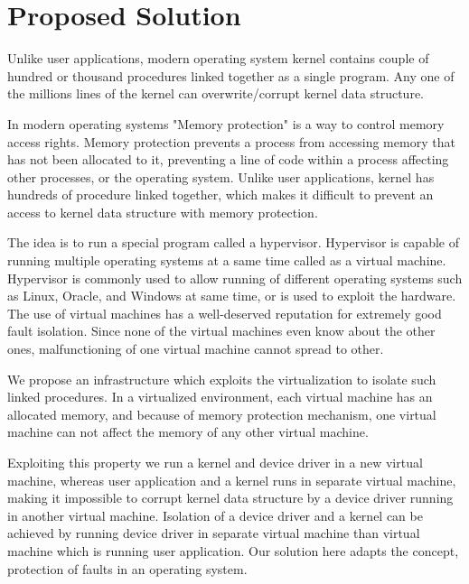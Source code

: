 \pagebreak
  
\section {Proposed Solution} 
Unlike user applications, modern operating system kernel contains couple of hundred or thousand procedures linked together as a single program\cite{Tanenbaum06canwe}. Any one of the millions lines of the kernel can overwrite/corrupt kernel data structure.

In modern operating systems "Memory protection" is a way to control memory access rights. Memory protection prevents a process from accessing memory that has not been allocated to it, preventing a line of code within a process affecting other processes, or the operating system\cite{Denning:1970:VM:356571.356573}\cite{Galvin}. Unlike user applications, kernel has hundreds of procedure linked together, which makes it difficult to prevent an access to kernel data structure with memory protection.

The idea is to run a special program called a hypervisor. Hypervisor is capable of running multiple operating systems at a same time called as a virtual machine\cite{Goldberg:1973:AVM:800122.803950}. Hypervisor is commonly used to allow running of different operating systems such as Linux, Oracle, and Windows at same time, or is used to exploit the hardware. The use of virtual machines has a well-deserved reputation for extremely good fault isolation. Since none of the virtual machines even know about the other ones, malfunctioning of one virtual machine cannot spread to other\cite{LeVasseur04UnmodifiedDriverReuse}.

We propose an infrastructure which exploits the virtualization to isolate such linked procedures. In a virtualized environment, each virtual machine has an allocated memory, and because of memory protection mechanism, one virtual machine can not affect the memory of any other virtual machine. 

Exploiting this property we run a kernel and device driver in a new virtual machine, whereas user application and a kernel runs in separate virtual machine, making it impossible to corrupt kernel data structure by a device driver running in another virtual machine. Isolation of a device driver and a kernel can be achieved by running device driver in separate virtual machine than virtual machine which is running user application. Our solution here adapts the concept, protection of faults in an operating system\cite{LeVasseur04UnmodifiedDriverReuse}.

